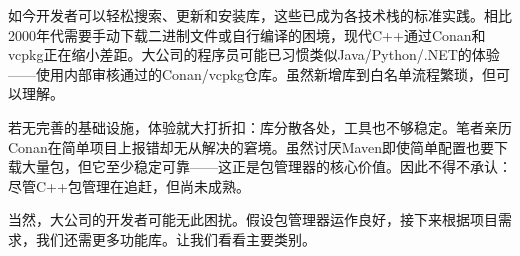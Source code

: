 如今开发者可以轻松搜索、更新和安装库，这些已成为各技术栈的标准实践。相比2000年代需要手动下载二进制文件或自行编译的困境，现代C++通过Conan和vcpkg正在缩小差距。大公司的程序员可能已习惯类似Java/Python/.NET的体验——使用内部审核通过的Conan/vcpkg仓库。虽然新增库到白名单流程繁琐，但可以理解。

若无完善的基础设施，体验就大打折扣：库分散各处，工具也不够稳定。笔者亲历Conan在简单项目上报错却无从解决的窘境。虽然讨厌Maven即使简单配置也要下载大量包，但它至少稳定可靠——这正是包管理器的核心价值。因此不得不承认：尽管C++包管理在追赶，但尚未成熟。

当然，大公司的开发者可能无此困扰。假设包管理器运作良好，接下来根据项目需求，我们还需更多功能库。让我们看看主要类别。




